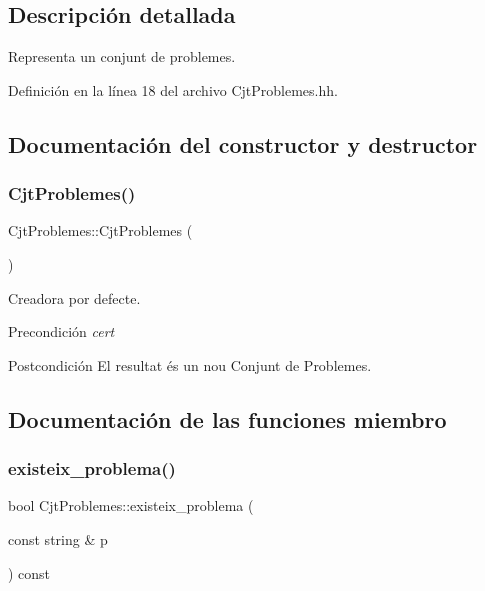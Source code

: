 \subsection{Descripción detallada}
Representa un conjunt de problemes. 

Definición en la línea 18 del archivo Cjt\+Problemes.\+hh.



\subsection{Documentación del constructor y destructor}
\mbox{\label{class_cjt_problemes_ae6f76d8e493e80bba4fc28a124826cb5}} 
\subsubsection{\texorpdfstring{Cjt\+Problemes()}{CjtProblemes()}}
{\footnotesize\ttfamily Cjt\+Problemes\+::\+Cjt\+Problemes (\begin{DoxyParamCaption}{ }\end{DoxyParamCaption})}



Creadora por defecte. 

\begin{DoxyPrecond}{Precondición}
{\itshape cert} 
\end{DoxyPrecond}
\begin{DoxyPostcond}{Postcondición}
El resultat és un nou Conjunt de Problemes. 
\end{DoxyPostcond}


\subsection{Documentación de las funciones miembro}
\mbox{\label{class_cjt_problemes_a27f5be292f79fd47915093fb84013e67}} 
\subsubsection{\texorpdfstring{existeix\+\_\+problema()}{existeix\_problema()}}
{\footnotesize\ttfamily bool Cjt\+Problemes\+::existeix\+\_\+problema (\begin{DoxyParamCaption}\item[{const string \&}]{p }\end{DoxyParamCaption}) const}



